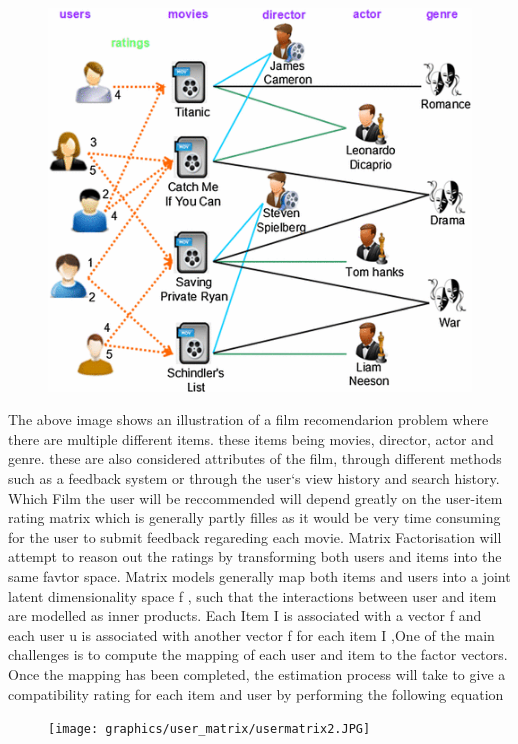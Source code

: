 \begin{figure}
  \includegraphics{graphics/user_matrix/usermatrix.JPG}
  \label{fig:usermatrix}
\end{figure}
The above image shows an illustration of a film recomendarion problem where there are multiple different items. these items being movies, director, actor and genre. these are also considered attributes of the film, through different methods such as a feedback system or through the user`s view history and search history. Which Film the user will be reccommended will depend greatly on the user-item rating matrix which is generally partly filles as it would be very time consuming for the user to submit feedback regareding each movie. Matrix Factorisation will attempt to reason out the ratings by transforming both users and items into the same favtor space.
Matrix models generally map both items and users into a joint latent dimensionality space f , such that the interactions between user and item are modelled as inner products. Each Item I is associated with a vector  f and each user u is associated with another vector f for each item I ,One of the main challenges is to compute the mapping of each user and item to the factor vectors. Once the mapping has been completed, the estimation process will take to give a compatibility rating for each item and user by performing the following equation
\begin{figure}
  \texttt{[image: graphics/user\_matrix/usermatrix2.JPG]}
  \label{fig:usermatrix2}
\end{figure}

